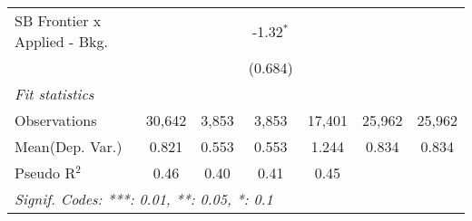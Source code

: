 \begin{tabular}{lcccccc}
   SB Frontier x Applied - Bkg.   &               &              & -1.32$^{*}$   &              &        &   \\   
                                  &               &              & (0.684)       &              &        &   \\   
   \midrule
   \emph{Fit statistics}\\
   Observations                   & 30,642        & 3,853        & 3,853         & 17,401       & 25,962 & 25,962\\  
Mean(Dep. Var.) & 0.821 & 0.553 & 0.553 & 1.244 & 0.834 & 0.834 \\
   Pseudo R$^2$                   & 0.46          & 0.40         & 0.41          & 0.45         &        & \\  
   \midrule \midrule
   \multicolumn{7}{l}{\emph{Signif. Codes: ***: 0.01, **: 0.05, *: 0.1}}\\
\end{tabular}
\par\endgroup
